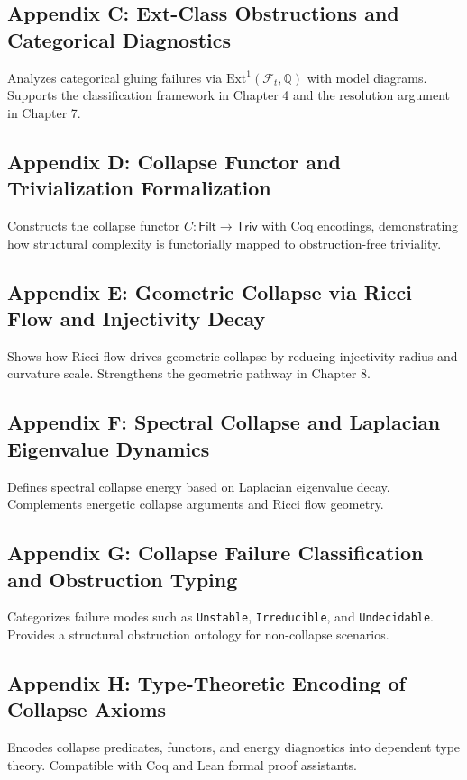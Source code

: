 \documentclass[11pt]{article}
\begin{document}
\subsection*{Appendix C: Ext-Class Obstructions and Categorical Diagnostics}
Analyzes categorical gluing failures via $\mathrm{Ext}^1(\mathcal{F}_t, \mathbb{Q})$ with model diagrams. Supports the classification framework in Chapter 4 and the resolution argument in Chapter 7.

\subsection*{Appendix D: Collapse Functor and Trivialization Formalization}
Constructs the collapse functor $C : \mathsf{Filt} \to \mathsf{Triv}$ with Coq encodings, demonstrating how structural complexity is functorially mapped to obstruction-free triviality.

\subsection*{Appendix E: Geometric Collapse via Ricci Flow and Injectivity Decay}
Shows how Ricci flow drives geometric collapse by reducing injectivity radius and curvature scale. Strengthens the geometric pathway in Chapter 8.

\subsection*{Appendix F: Spectral Collapse and Laplacian Eigenvalue Dynamics}
Defines spectral collapse energy based on Laplacian eigenvalue decay. Complements energetic collapse arguments and Ricci flow geometry.

\subsection*{Appendix G: Collapse Failure Classification and Obstruction Typing}
Categorizes failure modes such as \texttt{Unstable}, \texttt{Irreducible}, and \texttt{Undecidable}. Provides a structural obstruction ontology for non-collapse scenarios.

\subsection*{Appendix H: Type-Theoretic Encoding of Collapse Axioms}
Encodes collapse predicates, functors, and energy diagnostics into dependent type theory. Compatible with Coq and Lean formal proof assistants.
\end{document}

